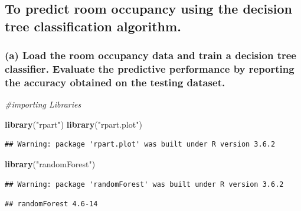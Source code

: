 \documentclass[]{article}
\newenvironment{Shaded}{\begin{snugshade}}{\end{snugshade}}
\newcommand{\CommentTok}[1]{\textcolor[rgb]{0.56,0.35,0.01}{\textit{#1}}}
\newcommand{\KeywordTok}[1]{\textcolor[rgb]{0.13,0.29,0.53}{\textbf{#1}}}
\newcommand{\NormalTok}[1]{#1}
\newcommand{\StringTok}[1]{\textcolor[rgb]{0.31,0.60,0.02}{#1}}
\begin{document}
\hypertarget{to-predict-room-occupancy-using-the-decision-tree-classification-algorithm.}{%
\subsection{To predict room occupancy using the decision tree
classification
algorithm.}\label{to-predict-room-occupancy-using-the-decision-tree-classification-algorithm.}}

\hypertarget{a-load-the-room-occupancy-data-and-train-a-decision-tree-classifier.-evaluate-the-predictive-performance-by-reporting-the-accuracy-obtained-on-the-testing-dataset.}{%
\subsubsection{(a) Load the room occupancy data and train a decision
tree classifier. Evaluate the predictive performance by reporting the
accuracy obtained on the testing
dataset.}\label{a-load-the-room-occupancy-data-and-train-a-decision-tree-classifier.-evaluate-the-predictive-performance-by-reporting-the-accuracy-obtained-on-the-testing-dataset.}}

\begin{Shaded}
\begin{Highlighting}[]
\CommentTok{#importing Libraries}

\KeywordTok{library}\NormalTok{(}\StringTok{"rpart"}\NormalTok{)}
\KeywordTok{library}\NormalTok{(}\StringTok{"rpart.plot"}\NormalTok{)}
\end{Highlighting}
\end{Shaded}

\begin{verbatim}
## Warning: package 'rpart.plot' was built under R version 3.6.2
\end{verbatim}

\begin{Shaded}
\begin{Highlighting}[]
\KeywordTok{library}\NormalTok{(}\StringTok{"randomForest"}\NormalTok{)}
\end{Highlighting}
\end{Shaded}

\begin{verbatim}
## Warning: package 'randomForest' was built under R version 3.6.2
\end{verbatim}

\begin{verbatim}
## randomForest 4.6-14
\end{verbatim}
\end{document}
